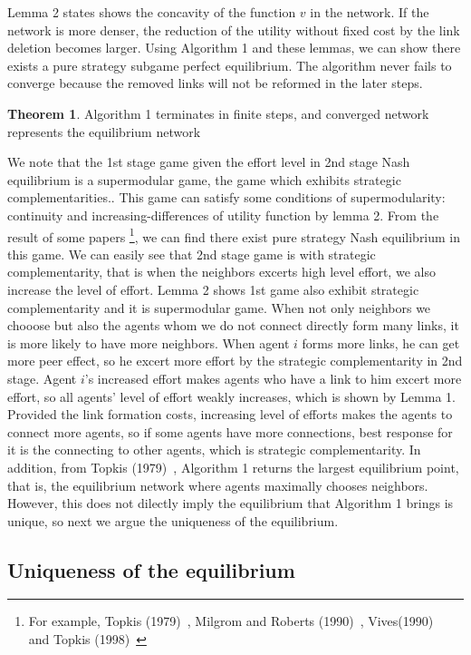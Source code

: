 \documentclass[12pt]{article}
\theoremstyle{definition}
\newtheorem{theorem}{Theorem}
\begin{document}
Lemma 2 states shows the concavity of the function $v$ in the network.
If the network is more denser, the reduction of the utility without fixed cost by the link deletion becomes larger.
Using Algorithm 1 and these lemmas, we can show there exists a pure strategy subgame perfect equilibrium.
The algorithm never fails to converge because the removed links will not be reformed in the later steps.

\begin{theorem}
Algorithm 1 terminates in finite steps, and converged network represents the equilibrium network
\end{theorem}

We note that the 1st stage game given the effort level in 2nd stage Nash equilibrium is a supermodular game, the game which exhibits strategic complementarities..
This game can satisfy some conditions of supermodularity: continuity and increasing-differences of utility function by lemma 2.
From the result of some papers \footnote{For example, Topkis (1979)~\cite{topkis1979}, Milgrom and Roberts (1990)~\cite{milgromroberts}, Vives(1990)~\cite{vives} and Topkis (1998)~\cite{topkis1998}}, we can find there exist pure strategy Nash equilibrium in this game.
We can easily see that 2nd stage game is with strategic complementarity, that is when the neighbors excerts high level effort, we also increase the level of effort.
Lemma 2 shows 1st game also exhibit strategic complementarity and it is supermodular game.
When not only neighbors we chooose but also the agents whom we do not connect directly form many links, it is more likely to have more neighbors.
When agent $i$ forms more links, he can get more peer effect, so he excert more effort by the strategic complementarity in 2nd stage.
Agent $i$'s increased effort makes agents who have a link to him excert more effort, so all agents' level of effort weakly increases, which is shown by Lemma 1.
Provided the link formation costs, increasing level of efforts makes the agents to connect more agents, so if some agents have more connections, best response for it is the connecting to other agents, which is strategic complementarity.
In addition, from Topkis (1979)~\cite{topkis1979}, Algorithm 1 returns the largest equilibrium point, that is, the equilibrium network where agents maximally chooses neighbors.
However, this does not dilectly imply the equilibrium that Algorithm 1 brings is unique, so next we argue the uniqueness of the equilibrium.


\subsection{Uniqueness of the equilibrium}
\end{document}
